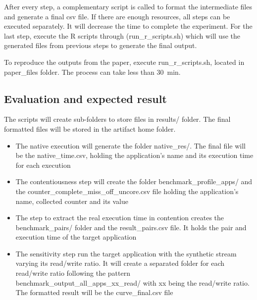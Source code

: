 \documentclass{sigplanconf}
\begin{document}
	After every step, a complementary script is called to format the intermediate files and
	generate a final csv file. If there are enough resources, all steps can be executed
	separately. It will decrease the time to complete the experiment. For the last step,
	execute the R scripts through (\textsf{run\_r\_scripts.sh}) which will use the generated
	files from previous steps to generate the final output.
	
	To reproduce the outputs from the paper, execute \textsf{run\_r\_scripts.sh}, located in
	\textsf{paper\_files} folder. The process can take less than \SI{30}{\minute}. 
	
	\subsection{Evaluation and expected result} 
	
	The scripts will create sub-folders to store files in \textsf{results/} folder. The final formatted files will be stored in the artifact home folder.
	
	\begin{itemize}
		
		\item The native execution will generate the folder \textsf{native\_res/}. The final file will be the \textsf{native\_time.csv}, holding the application's name and its execution time for each execution
		
		\item The contentiousness step will create the folder
		\textsf{benchmark\_profile\_apps/} and the
		\textsf{counter\_complete\_miss\_off\_uncore.csv} file holding the application's
		name, collected counter and its value
		
		\item The step to extract the real execution time in contention creates the
		\textsf{benchmark\_pairs/} folder and the \textsf{result\_pairs.csv}
		file. It holds the pair and execution time of the target
		application
		
		\item The sensitivity step run the target application with the synthetic stream
		varying its read/write ratio. It will create a separated folder for each
		read/write ratio following the pattern
		\textsf{benchmark\_output\_all\_apps\_xx\_read/} with \textsf{xx} being the
		read/write ratio. The formatted result will be the \textsf{curve\_final.csv} file
		
	\end{itemize} 
	
\end{document}

